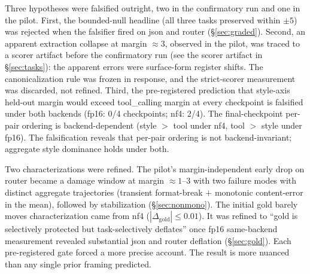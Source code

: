 \documentclass{article}
\begin{document}
Three hypotheses were falsified outright, two in the confirmatory run and one in the pilot. First, the bounded-null headline (all three tasks preserved within $\pm5$) was rejected when the falsifier fired on json and router (\S\ref{sec:graded}). Second, an apparent extraction collapse at margin ${\approx}3$, observed in the pilot, was traced to a scorer artifact before the confirmatory run (see the scorer artifact in \S\ref{sec:tasks}): the apparent errors were surface-form register shifts. The canonicalization rule was frozen in response, and the strict-scorer measurement was discarded, not refined. Third, the pre-registered prediction that style-axis held-out margin would exceed tool\_calling margin at every checkpoint is falsified under both backends (fp16: 0/4 checkpoints; nf4: 2/4). The final-checkpoint per-pair ordering is backend-dependent (style $>$ tool under nf4, tool $>$ style under fp16). The falsification reveals that per-pair ordering is not backend-invariant; aggregate style dominance holds under both.

Two characterizations were refined. The pilot's margin-independent early drop on router became a damage window at margin ${\approx}1$--3 with two failure modes with distinct aggregate trajectories (transient format-break $+$ monotonic content-error in the mean), followed by stabilization (\S\ref{sec:nonmono}). The initial gold barely moves characterization came from nf4 ($|\Delta_{\text{gold}}| \le 0.01$). It was refined to ``gold is selectively protected but task-selectively deflates'' once fp16 same-backend measurement revealed substantial json and router deflation (\S\ref{sec:gold}). Each pre-registered gate forced a more precise account. The result is more nuanced than any single prior framing predicted.
\end{document}
